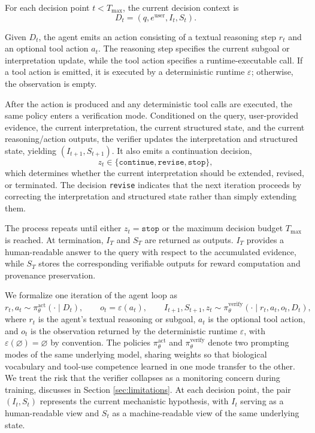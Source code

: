 \documentclass[thesis,letterpaper,12pt]{utthesis}
\begin{document}
For each decision point $t < T_{\max}$, the current decision context is
\[
D_t = (q, e^{\text{user}}, I_t, S_t).
\]

Given $D_t$, the agent emits an action consisting of a textual reasoning step $r_t$ and an optional tool action $a_t$. The reasoning step specifies the current subgoal or interpretation update, while the tool action specifies a runtime-executable call. If a tool action is emitted, it is executed by a deterministic runtime $\varepsilon$; otherwise, the observation is empty.

After the action is produced and any deterministic tool calls are executed, the same policy enters a verification mode. Conditioned on the query, user-provided evidence, the current interpretation, the current structured state, and the current reasoning/action outputs, the verifier updates the interpretation and structured state, yielding $(I_{t+1}, S_{t+1})$. It also emits a continuation decision,
\[
z_t \in \{\texttt{continue}, \texttt{revise}, \texttt{stop}\},
\]
which determines whether the current interpretation should be extended, revised, or terminated. The decision \texttt{revise} indicates that the next iteration proceeds by correcting the interpretation and structured state rather than simply extending them.

The process repeats until either $z_t = \texttt{stop}$ or the maximum decision budget $T_{\max}$ is reached. At termination, $I_T$ and $S_T$ are returned as outputs. $I_T$ provides a human-readable answer to the query with respect to the accumulated evidence, while $S_T$ stores the corresponding verifiable outputs for reward computation and provenance preservation.

We formalize one iteration of the agent loop as
\[
r_t, a_t \sim \pi_{\theta}^{\mathrm{act}}(\cdot \mid D_t), \qquad
o_t = \varepsilon(a_t), \qquad
I_{t+1}, S_{t+1}, z_t \sim \pi_{\theta}^{\mathrm{verify}}(\cdot \mid r_t, a_t, o_t, D_t),
\]
where $r_t$ is the agent's textual reasoning or subgoal, $a_t$ is the optional tool action, and $o_t$ is the observation returned by the deterministic runtime $\varepsilon$, with $\varepsilon(\varnothing)=\varnothing$ by convention. The policies $\pi_{\theta}^{\mathrm{act}}$ and $\pi_{\theta}^{\mathrm{verify}}$ denote two prompting modes of the same underlying model, sharing weights so that biological vocabulary and tool-use competence learned in one mode transfer to the other. We treat the risk that the verifier collapses as a monitoring concern during training, discusses in Section \ref{sec:limitations}. At each decision point, the pair $(I_t, S_t)$ represents the current mechanistic hypothesis, with $I_t$ serving as a human-readable view and $S_t$ as a machine-readable view of the same underlying state.
\end{document}
